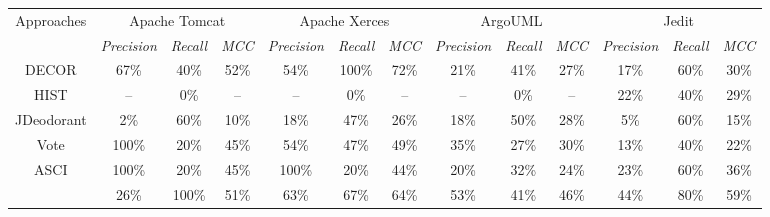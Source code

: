\begin{table}
\begin{adjustbox}{width=\textwidth}
\begin{tabular}{|c|c|c|c|c|c|c|c|c|c|c|c|c|}
\hline
\multirow{2}{*}{Approaches}& 
\multicolumn{3}{c|}{
	Apache Tomcat
} 
&\multicolumn{3}{c|}{
	Apache Xerces
}
&\multicolumn{3}{c|}{
	ArgoUML
}
&\multicolumn{3}{c|}{
	Jedit 
}\bigstrut [t] \\ 
\cline{2-13}
&\textit{Precision}&\textit{Recall}&\textit{  MCC  }
&\textit{Precision}&\textit{Recall}&\textit{  MCC  }
&\textit{Precision}&\textit{Recall}&\textit{  MCC  }
&\textit{Precision}&\textit{Recall}&\textit{  MCC  } \bigstrut [t]\\
\hline
DECOR &67\%&40\%&52\%&54\%&100\%&72\%&21\%&41\%&27\%&17\%&60\%&30\% \bigstrut \\ \hline
HIST &--&0\%&--&--&0\%&--&--&0\%&--&22\%&40\%&29\% \bigstrut \\ \hline
JDeodorant &2\%&60\%&10\%&18\%&47\%&26\%&18\%&50\%&28\%&5\%&60\%&15\% \bigstrut \\ \hline
Vote &100\%&20\%&45\%&54\%&47\%&49\%&35\%&27\%&30\%&13\%&40\%&22\% \bigstrut \\ \hline
ASCI &100\%&20\%&45\%&100\%&20\%&44\%&20\%&32\%&24\%&23\%&60\%&36\% \bigstrut \\ \hline
\textbf{\NAME{}} &26\%&100\%&51\%&63\%&67\%&64\%&53\%&41\%&46\%&44\%&80\%&59\% \bigstrut \\ \hline
\end{tabular}
\end{adjustbox}

\vspace{2cm}


\end{table}
